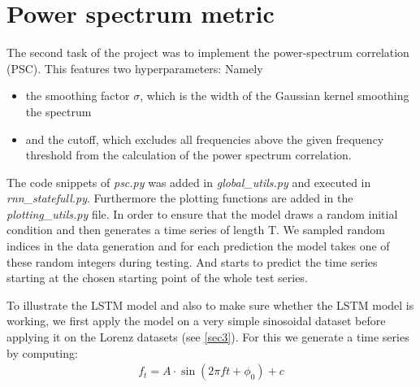 \section{Power spectrum metric}

The second task of the project was to implement the power-spectrum correlation (PSC). This features two hyperparameters: Namely
\begin{itemize}
	\item the smoothing factor $\sigma$, which is the width of the Gaussian kernel smoothing the spectrum
	\item and the cutoff, which excludes all frequencies above the given frequency threshold from the calculation of the power spectrum correlation.
\end{itemize}
The code snippets of \textit{psc.py} was added in \textit{global\_utils.py} and executed in \textit{rnn\_statefull.py}. Furthermore the plotting functions are added in the \textit{plotting\_utils.py} file.
In order to ensure that the model draws a random initial condition and then generates a time series of length T. We sampled random indices in the data generation and for each prediction the model takes one of these random integers during testing. And starts to predict the time series starting at the chosen starting point of the whole test series.

To illustrate the LSTM model and also to make sure whether the LSTM model is working, we first apply the model on a very simple sinosoidal dataset before applying it on the Lorenz datasets (see \cref{sec3}). For this we generate a time series by computing:
\begin{align}
	f_t = A\cdot\sin(2\pi ft+\phi_0)+c
\end{align}

